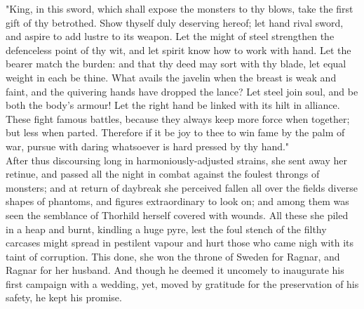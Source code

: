 \documentclass[10pt,a4paper]{report}
\begin{document}
"King, in this sword, which shall expose the monsters to thy blows, take the first gift of thy betrothed. Show thyself duly deserving hereof; let hand rival sword, and aspire to add lustre to its weapon. Let the might of steel strengthen the defenceless point of thy wit, and let spirit know how to work with hand. Let the bearer match the burden: and that thy deed may sort with thy blade, let equal weight in each be thine. What avails the javelin when the breast is weak and faint, and the quivering hands have dropped the lance? Let steel join soul, and be both the body's armour! Let the right hand be linked with its hilt in alliance. These fight famous battles, because they always keep more force when together; but less when parted. Therefore if it be joy to thee to win fame by the palm of war, pursue with daring whatsoever is hard pressed by thy hand."\\

After thus discoursing long in harmoniously-adjusted strains, she sent away her retinue, and passed all the night in combat against the foulest throngs of monsters; and at return of daybreak she perceived fallen all over the fields diverse shapes of phantoms, and figures extraordinary to look on; and among them was seen the semblance of Thorhild herself covered with wounds. All these she piled in a heap and burnt, kindling a huge pyre, lest the foul stench of the filthy carcases might spread in pestilent vapour and hurt those who came nigh with its taint of corruption. This done, she won the throne of Sweden for Ragnar, and Ragnar for her husband. And though he deemed it uncomely to inaugurate his first campaign with a wedding, yet, moved by gratitude for the preservation of his safety, he kept his promise.\\
\end{document}
